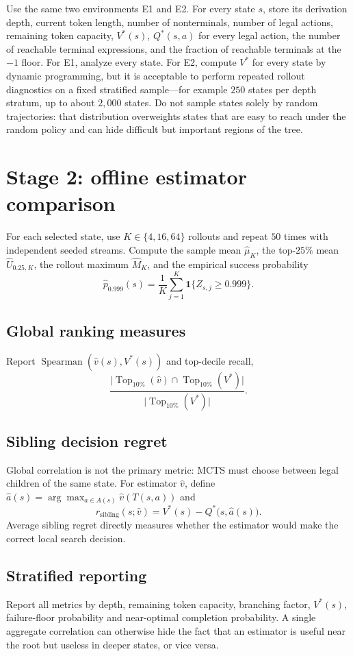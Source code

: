Use the same two environments E1 and E2. For every state $s$, store its
derivation depth, current token length, number of nonterminals, number of legal
actions, remaining token capacity, $V^*(s)$, $Q^*(s,a)$ for every legal action,
the number of reachable terminal expressions, and the fraction of reachable
terminals at the $-1$ floor. For E1, analyze every state. For E2, compute $V^*$
for every state by dynamic programming, but it is acceptable to perform repeated
rollout diagnostics on a fixed stratified sample---for example $250$ states per
depth stratum, up to about $2{,}000$ states. Do not sample states solely by
random trajectories: that distribution overweights states that are easy to reach
under the random policy and can hide difficult but important regions of the tree.

\section{Stage 2: offline estimator comparison}

For each selected state, use $K\in\{4,16,64\}$ rollouts and repeat $50$ times with
independent seeded streams. Compute the sample mean $\widehat\mu_K$, the top-$25\%$
mean $\widehat U_{0.25,K}$, the rollout maximum $\widehat M_K$, and the empirical
success probability
\[
  \widehat p_{0.999}(s)=\frac1K\sum_{j=1}^K\mathbf 1\{Z_{s,j}\ge 0.999\}.
\]

\subsection{Global ranking measures}
Report $\operatorname{Spearman}(\widehat v(s),V^*(s))$ and top-decile recall,
\[
  \frac{\bigl|\operatorname{Top}_{10\%}(\widehat v)\cap\operatorname{Top}_{10\%}(V^*)\bigr|}
       {\bigl|\operatorname{Top}_{10\%}(V^*)\bigr|}.
\]

\subsection{Sibling decision regret}
Global correlation is not the primary metric: MCTS must choose between legal
children of the same state. For estimator $\widehat v$, define
$\widehat a(s)=\arg\max_{a\in A(s)}\widehat v(T(s,a))$ and
\[
  \boxed{\; r_{\mathrm{sibling}}(s;\widehat v)=V^*(s)-Q^*\bigl(s,\widehat a(s)\bigr). \;}
\]
Average sibling regret directly measures whether the estimator would make the
correct local search decision.

\subsection{Stratified reporting}
Report all metrics by depth, remaining token capacity, branching factor,
$V^*(s)$, failure-floor probability and near-optimal completion probability. A
single aggregate correlation can otherwise hide the fact that an estimator is
useful near the root but useless in deeper states, or vice versa.

